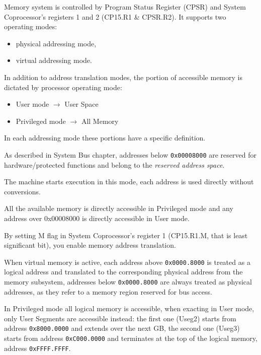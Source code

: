 \label{sec:man:memory}
Memory system is controlled by Program Status Register (CPSR) and System Coprocessor's registers 1 and 2 (CP15.R1 \& CPSR.R2). It supports two operating modes:

\begin{itemize}
\item physical addressing mode, 
\item virtual addressing mode.
\end{itemize}

In addition to address translation modes, the portion of accessible memory is dictated by processor operating mode:

\begin{itemize}
\item User mode $\rightarrow$ User Space
\item Privileged mode $\rightarrow$ All Memory
\end{itemize}

In each addressing mode these portions have a specific definition.

As described in System Bus chapter, addresses below \texttt{0x00008000} are reserved for hardware/protected functions and belong to the \emph{reserved address space}.

The machine starts execution in this mode, each address is used directly without conversions.

All the available memory is directly accessible in Privileged mode and any address over 0x00008000 is directly accessible in User mode.

\vspace{10px}



\label{sec:man:virtualMemory}
By setting M flag in System Coprocessor's register 1 (CP15.R1.M, that is least significant bit), you enable memory address translation.

When virtual memory is active, each address above \texttt{0x0000.8000} is treated as a logical address and translated to the corresponding physical address from the memory subsystem, addresses below \texttt{0x0000.8000} are always treated as physical addresses, as they refer to a memory region reserved for bus access.

In Privileged mode all logical memory is accessible, when exacting in User mode, only User Segments are accessible instead: the first one (Useg2) starts from address \texttt{0x8000.0000} and extends over the next GB, the second one (Useg3) starts from address \texttt{0xC000.0000} and terminates at the top of the logical memory, address \texttt{0xFFFF.FFFF}.

